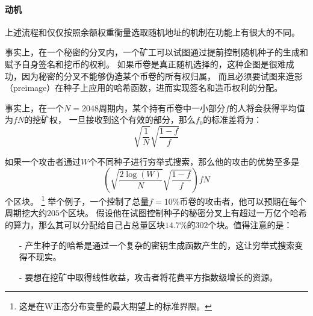 \documentclass[letterpaper]{article}
\begin{document}
\paragraph{动机}
上述流程和仅仅按照余额权重衡量选取随机地址的机制在功能上有很大的不同。

事实上，在一个秘密的分叉内，一个矿工可以试图通过提前控制随机种子的生成和赋予自身签名和挖币的权利。
如果币卷是真正随机选择的，这种企图是很难成功，因为秘密的分叉不能够伪造某个币卷的所有权归属，
而且必须要试图来造影（preimage）在种子上应用的哈希函数，进而实现签名和造币权利的分配。

事实上，在一个$N=\num{2048}$周期内，某个持有币卷中一小部分$f$的人将会获得平均值为$f N$的挖矿权，
一旦接收到这个有效的部分，那么$f_0$的标准差将为：$$\sqrt{\frac{1}{N}}\sqrt{\frac{1-f}{f}}$$

如果一个攻击者通过$W$个不同种子进行穷举式搜索，那么他的攻击的优势至多是$$\left(\sqrt{\frac{2\log(W)}{N}}\sqrt{\frac{1-f}{f}}\right)fN$$个区块。
\footnote{这是在W正态分布变量的最大期望上的标准界限。}
举个例子，一个控制了总量$f = 10\%$币卷的攻击者，他可以预期在每个周期挖大约$205$个区块。
假设他在试图控制种子的秘密分叉上有超过一万亿个哈希的算力，那么其可以分配给自己占总量区块$14.7\%$的$302$个块。值得注意的是：
\begin{itemize}
\item[-] %
产生种子的哈希是通过一个复杂的密钥生成函数产生的，这让穷举式搜索变得不现实。
\item[-] %
要想在挖矿中取得线性收益，攻击者将花费平方指数级增长的资源。
\end{itemize}
\end{document}
